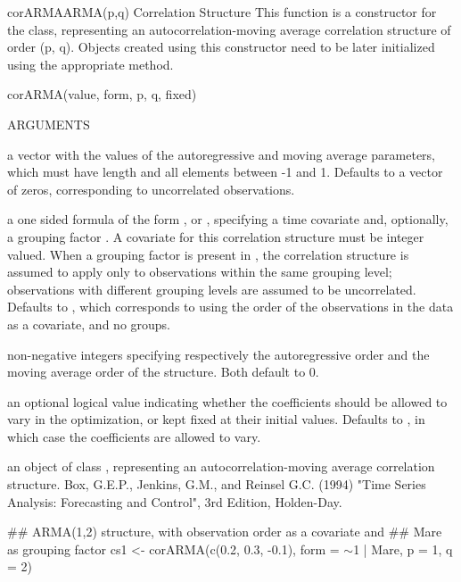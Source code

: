 \documentclass[pdftex]{article} \usepackage{url,graphicx}
\renewcommand{\Twiddle}{\mbox{\(\sim\)}}
\begin{document}
\begin{Helpfile}{corARMA}{ARMA(p,q) Correlation Structure}
This function is a constructor for the  class,
representing an autocorrelation-moving average correlation structure
of order (p, q). Objects created using this constructor need to be
later initialized using the appropriate  method.
\begin{Example}
corARMA(value, form, p, q, fixed)
\end{Example}
\begin{Argument}{ARGUMENTS}
\item[\Co{value:}]
a vector with the values of the autoregressive and moving
average parameters, which must have length  and all
elements between -1 and 1. Defaults to a vector of zeros,
corresponding to uncorrelated observations.
\item[\Co{form:}]
a one sided formula of the form \Co{\Twiddle t}, or \Co{\Twiddle t |
g}, specifying a time covariate  and,  optionally, a
grouping factor . A covariate for this correlation structure
must be integer valued. When a grouping factor is present in
, the correlation structure is assumed to apply only
to observations within the same grouping level; observations with
different grouping levels are assumed to be uncorrelated. Defaults to
\Co{\Twiddle 1}, which corresponds to using the order of the observations
in the data as a covariate, and no groups.
\item[\Co{p, q:}]
non-negative integers specifying respectively the
autoregressive order and the moving average order of the 
structure. Both default to 0.
\item[\Co{fixed:}]
an optional logical value indicating whether the
coefficients should be allowed to vary in the optimization, or kept
fixed at their initial values. Defaults to , in which case
the coefficients are allowed to vary.
\end{Argument}
an object of class , representing an
autocorrelation-moving average correlation structure.
Box, G.E.P., Jenkins, G.M., and Reinsel G.C. (1994) "Time Series
Analysis: Forecasting and Control", 3rd Edition, Holden-Day.
\need 15pt
\vspace{-16pt} 
\begin{Example}
## ARMA(1,2) structure, with observation order as a covariate and
## Mare as grouping factor
cs1 <- corARMA(c(0.2, 0.3, -0.1), form = \Twiddle 1 | Mare, p = 1, q = 2)
\end{Example}
\end{Helpfile}
\end{document}

